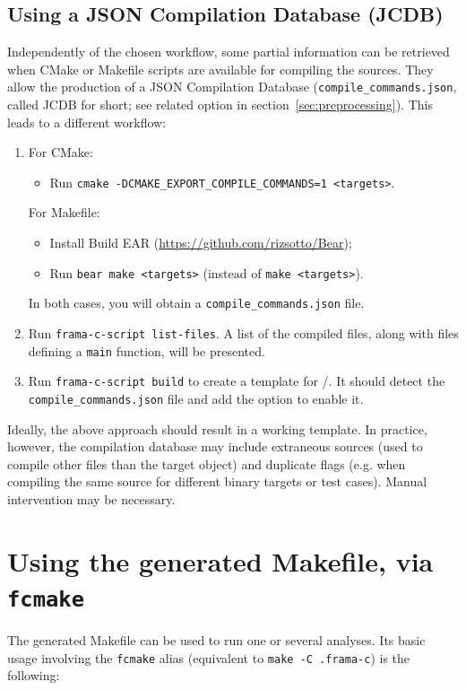 \subsection{Using a JSON Compilation Database (JCDB)}
\label{sec:using-json-comp}
Independently of the chosen workflow, some partial information can be retrieved
when CMake or Makefile scripts are available for compiling the sources.
They allow the production of a JSON Compilation Database
(\texttt{compile\_commands.json}, called JCDB for short; see related option
in section~\ref{sec:preprocessing}). This leads to a different workflow:

\begin{enumerate}
\item For CMake:
  \begin{itemize}
  \item Run \texttt{cmake -DCMAKE\_EXPORT\_COMPILE\_COMMANDS=1 <targets>}.
  \end{itemize}
  For Makefile:
  \begin{itemize}
  \item Install Build EAR (\url{https://github.com/rizsotto/Bear});
  \item Run \texttt{bear~make~<targets>} (instead of \texttt{make <targets>}).
  \end{itemize}
  In both cases, you will obtain a \texttt{compile\_commands.json} file.
\item Run \texttt{frama-c-script list-files}. A list of the compiled files,
  along with files defining a \texttt{main} function, will be presented.
\item Run \texttt{frama-c-script build} to create a template for
  \FramaC/\Value. It should detect the \texttt{compile\_commands.json} file
  and add the option to enable it.
\end{enumerate}

Ideally, the above approach should result in a working template. In practice,
however, the compilation database may include extraneous sources
(used to compile other files than the target object) and duplicate flags
(e.g. when compiling the same source for different binary targets or test
cases). Manual intervention may be necessary.

\section{Using the generated Makefile, via \texttt{fcmake}}
\label{sec:using-generated-makefile}

The generated Makefile can be used to run one or several analyses.
Its basic usage involving the \texttt{fcmake} alias (equivalent to
\texttt{make -C .frama-c}) is the following:

